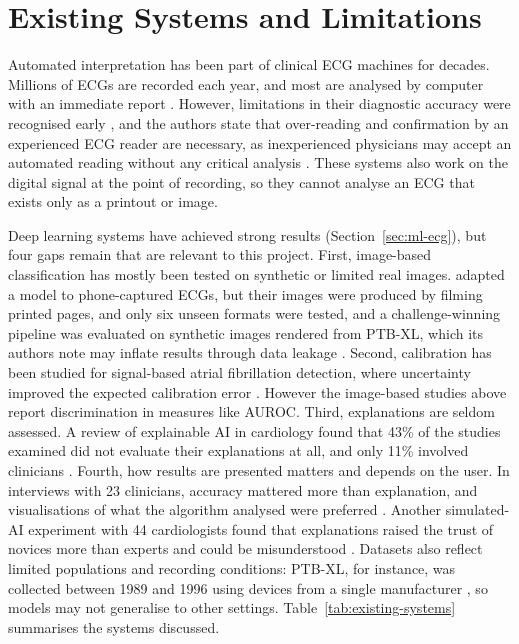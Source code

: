 \section{Existing Systems and Limitations}
\label{sec:existing-systems}

Automated interpretation has been part of clinical ECG machines for decades. Millions of
ECGs are recorded each year, and most are analysed by computer with an immediate report
\cite{schlapfer_computer-interpreted_2017}. However, limitations in their diagnostic
accuracy were recognised early , and the authors state that over-reading and
confirmation by an experienced ECG reader are necessary, as inexperienced physicians
may accept an automated reading without any critical analysis
\cite{schlapfer_computer-interpreted_2017}. These systems also work on the digital signal at the point of recording, so they cannot analyse an ECG that exists only as a printout or image.

Deep learning systems have achieved strong results (Section~\ref{sec:ml-ecg}), but four
gaps remain that are relevant to this project. First, image-based classification has
mostly been tested on synthetic or limited real images. \textcite{gliner_domain_2023}
adapted a model to phone-captured ECGs, but their images were produced by filming printed
pages, and only six unseen formats were tested, and a challenge-winning pipeline was
evaluated on synthetic images rendered from PTB-XL, which its authors note may inflate
results through data leakage \cite{wang_pipeline_2025}. Second, calibration has been
studied for signal-based atrial fibrillation detection, where uncertainty improved the expected calibration error \cite{chen_quantifying_2022}. However  the image-based
studies above report discrimination in measures like AUROC. Third, explanations are seldom assessed. A review of explainable AI in cardiology found that 43\% of the studies examined did not evaluate their explanations at
all, and only 11\% involved clinicians \cite{salih_review_2024}. Fourth, how results are presented matters and depends on the user. In interviews with 23 clinicians, accuracy mattered more than explanation, and visualisations of what the algorithm analysed were preferred \cite{hughes-noehrer_contrasting_2024}. Another simulated-AI experiment with 44
cardiologists found that explanations raised the trust of novices more than experts and could be misunderstood \cite{cabitza_painting_2023}. Datasets also reflect limited populations and
recording conditions: PTB-XL, for instance, was collected between 1989 and 1996 using devices from a single manufacturer \cite{wagner_ptbxl_2020}, so models may not generalise
to other settings. Table~\ref{tab:existing-systems} summarises the systems discussed.

